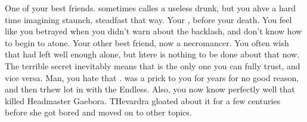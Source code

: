 \documentclass[char]{Katmeers}
\begin{document}
\begin{contacts}
	\contact{\cRon{}} One of your best friends. \cHermione{} sometimes calles \cRon{\them} a useless drunk, but you ahve a hard time imagining staunch, steadfast \cRon{} that way.
	\contact{\cGinny{}} Your \cGinny{\significant}, before your death. You feel like you betrayed \cGinny{\them} when you didn't warn \cGinny{\them} about the backlash, and don't know how to begin to atone.
	\contact{\cHermione{}} Your other best friend, now a necromancer. You often wish that \cHermione{\they} had left well enough alone, but htere is nothing to be done about that now. The terrible secret inevitably means that \cHermione{} is the only one you can fully trust, and vice versa.
	\contact{\cMalfoy{}} Man, you hate that \cMalfoy{\guy}. \cMalfoy{\They} was a prick to you for years for no good reason, and then trhew \cMalfoy{\their} lot in with the Endless. Also, you now know perfectly well that \cMalfoy{\they} killed Headmaster Gaebora. THevardra gloated about it for a few centuries before she got bored and moved on to other topics.
\end{contacts}
\end{document}
